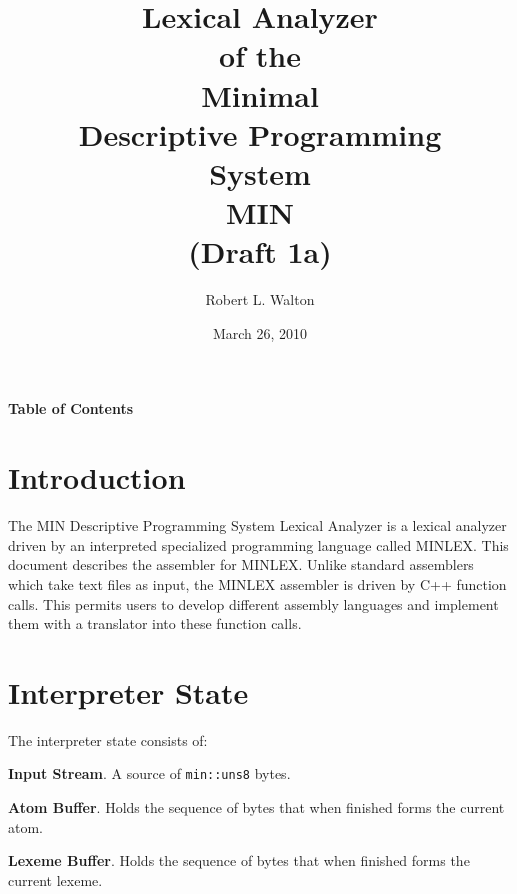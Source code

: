 \documentclass[12pt]{article}
\begin{document}
        
\title{Lexical Analyzer\\[2ex]of the\\[2ex]
       Minimal\\Descriptive Programming\\System\\[2ex]MIN\\[2ex]
       (Draft 1a)}

\author{Robert L. Walton}

\date{March 26, 2010}
 
\maketitle

\newpage
\begin{center}
\large \bf Table of Contents
\end{center}

\bigskip

\tableofcontents 

\newpage

\section{Introduction}

The MIN Descriptive Programming System Lexical Analyzer is a lexical
analyzer driven by an interpreted specialized programming language
called MINLEX.  This document describes the assembler for MINLEX.
Unlike standard assemblers which take text files as input, the
MINLEX assembler is driven by C++ function calls.  This permits
users to develop different assembly languages and implement them
with a translator into these function calls.

\section{Interpreter State}

The interpreter state consists of:

\begin{list}{}{}
\item {\bf Input Stream}. A source of {\tt min::uns8} bytes.

\item {\bf Atom Buffer}.  Holds the sequence of bytes that when
finished forms the current atom.

\item {\bf Lexeme Buffer}.  Holds the sequence of bytes that when
finished forms the current lexeme.

\end{list}




\printindex
\end{document}
